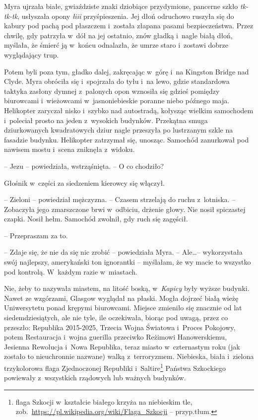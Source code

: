 \documentclass[oneside,polish,11pt,sfheadings]{mwbk}
\begin{document}
Myra ujrzała białe, gwiaździste znaki dziobiące przydymione, pancerne
szkło \textit{tk-tk-tk}, usłyszała opony \textit{łiii} przyśpieszenia. Jej
dłoń odruchowo ruszyła się do kabury pod pachą pod płaszczem i~została
złapana pasami bezpieczeństwa. Przez chwilę, gdy patrzyła w~dół na jej
ostatnio, znów gładką i~nagle białą dłoń, myślała, że śmierć ją w~końcu
odnalazła, że umrze staro i~zostawi dobrze wyglądający trup.

Potem byli poza tym, gładko dalej, zakręcając w~górę i~na Kingston
Bridge nad Clyde. Myra obróciła się i~spojrzała do tyłu i~na lewo, gdzie
standardowa taktyka zasłony dymnej z~palonych opon wznosiła się gdzieś
pomiędzy biurowcami i~wieżowcami w~jasnoniebieskie poranne niebo późnego
maja. Helikopter zaryczał nisko i~szybko nad autostradą, kołysząc
wielkim samochodem i~poleciał prosto na jeden z~wysokich budynków.
Przekątna smuga dziurkowanych kwadratowych dziur nagle przeszyła po
lustrzanym szkle na fasadzie budynku. Helikopter zatrzymał się, unosząc.
Samochód zanurkował pod nawisem mostu i~scena zniknęła z~widoku.

-- Jezu -- powiedziała, wstrząśnięta. -- O co chodziło?

Głośnik w~części za siedzeniem kierowcy się włączył. 

-- Zieloni -- powiedział mężczyzna. -- Czasem strzelają do ruchu z~lotniska. -- Zobaczyła jego zmarszczone brwi w~odbiciu, drżenie głowy. Nie nosił
spiczastej czapki. Nosił hełm. Samochód zwolnił, gdy ruch się zagęścił.

-- Przepraszam za to.

-- Zdaje się, że nie da się nic zrobić -- powiedziała Myra. -- Ale\ldots -- wykorzystała swój najlepszy, amerykański ton ignorantki -- myślałam, że
wy macie to wszystko pod kontrolą. W~każdym razie w~miastach.

Nie, żeby to nazywała miastem, na litość boską, w~\textit{Kapicy} były
wyższe budynki. Nawet ze wzgórzami, Glasgow wyglądał na płaski. Mogła
dojrzeć białą wieżę Uniwersytetu ponad krępymi biurowcami. Miejsce
zmieniło się znacznie od lat siedemdziesiątych, ale nie tyle, ile
oczekiwała, biorąc pod uwagą, przez co przeszło: Republika 2015-2025,
Trzecia Wojna Światowa i~Proces Pokojowy, potem Restauracja i~wojna
guerilla przeciwko Reżimowi Hanowerskiemu, Jesienna Rewolucja i~Nowa
Republika, teraz miasto w~czternastym roku (jak zostało to nieuchronnie
nazwane) walką z~terroryzmem. Niebieska, biała i~zielona trzykolorowa
flaga Zjednoczonej Republiki i~Saltire\footnote{flaga Szkocji w~kształcie
białego krzyża na niebieskim tle,
zob.~\url{https://pl.wikipedia.org/wiki/Flaga\_Szkocji} -- przyp.tłum.} Państwa Szkockiego powiewały z~wszystkich rządowych lub
ważnych budynków.
\end{document}
